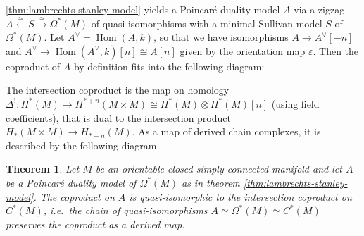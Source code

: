 \documentclass{scrartcl}
\theoremstyle{plain}
\newtheorem{theorem}{Theorem}[section]
\theoremstyle{definition}
\renewcommand{\epsilon}{\varepsilon}
\newcommand{\capp}{\mathbin{\frown}}
\newcommand{\iso}{\cong}
\newcommand{\quiso}{\simeq}
\let\xto\xrightarrow
\let\xfrom\xleftarrow
\DeclareMathOperator{\Hom}{Hom}
\begin{document}
\cref{thm:lambrechts-stanley-model} yields a Poincaré duality model $A$ via a zigzag $A\xfrom{\quiso} S\xto\quiso \Omega^*(M)$ of quasi-isomorphisms with a minimal Sullivan model $S$ of $\Omega^*(M)$. Let $A^\vee = \Hom(A, k)$, so that we have isomorphisms $A\to A^\vee[-n]$ and $A^\vee\to \Hom(A^\vee, k)[n] \iso A[n]$ given by the orientation map $\epsilon$. Then the coproduct of $A$ by definition fits into the following diagram:
\begin{center}
\end{center}


The intersection coproduct is the map on homology $\Delta^!\colon H^*(M)\to H^{*+n}(M\times M)\iso H^*(M)\otimes H^*(M)[n]$ (using field coefficients), that is dual to the intersection product $H_*(M\times M) \to H_{*-n}(M)$. As a map of derived chain complexes, it is described by the following diagram
\begin{center}
\end{center}

\begin{theorem}\label{thm:pd-model-intersection-product}
    Let $M$ be an orientable closed simply connected manifold and let $A$ be a Poincaré duality model of $\Omega^*(M)$ as in theorem \ref{thm:lambrechts-stanley-model}. The coproduct on $A$ is quasi-isomorphic to the intersection coproduct on $C^*(M)$, i.e.\ the chain of quasi-isomorphisms $A\quiso\Omega^*(M)\quiso C^*(M)$ preserves the coproduct as a derived map.
\end{theorem}
\end{document}
